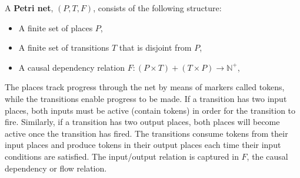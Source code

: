 \begin{definition}
  \label{def:Original-Petri-Net}
A \textbf{Petri net}, $(P, T, F)$, consists of the following structure:  
  \begin{itemize}
  \item A finite set of places $P$,
  \item A finite set of transitions $T$ that is disjoint from $P$,
  \item A causal dependency relation $F: (P \times T) + (T \times P) \to \mathbb{N}^+ $, 
  \end{itemize}
\end{definition}
The places track progress through the net by means of markers called tokens, while the transitions enable progress to be made. If a transition has two input places, both inputs must be active (contain tokens) in order for the transition to fire. Similarly, if a transition has two output places, both places will become active once the transition has fired. The transitions consume tokens from their input places and produce tokens in their output places each time their input conditions are satisfied. The input/output relation is captured in $F$, the causal dependency or flow relation. 
